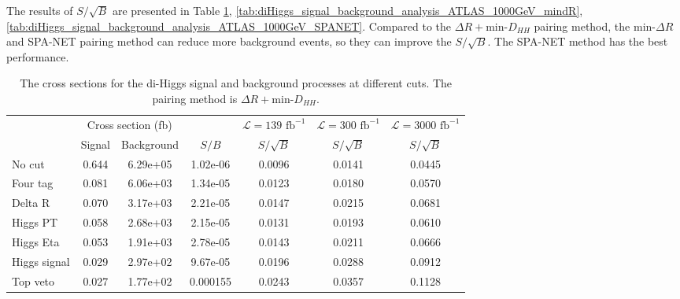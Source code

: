 \documentclass[12pt]{article}
\begin{document}
	The results of $S/\sqrt{B}$ are presented in Table \ref{tab:diHiggs_signal_background_analysis_ATLAS_1000GeV_DHH}, \ref{tab:diHiggs_signal_background_analysis_ATLAS_1000GeV_mindR}, \ref{tab:diHiggs_signal_background_analysis_ATLAS_1000GeV_SPANET}. Compared to the $\Delta R + \text{min-}D_{HH}$ pairing method, the $\text{min-}\Delta R$ and SPA-NET pairing method can reduce more background events, so they can improve the $S/\sqrt{B}$. The SPA-NET method has the best performance.
	\begin{table}[htpb]
		\centering
		\caption{The cross sections for the di-Higgs signal and background processes at different cuts. The pairing method is $\Delta R + \text{min-}D_{HH}$.}
		\label{tab:diHiggs_signal_background_analysis_ATLAS_1000GeV_DHH}
		\begin{tabular}{l|cc|c|c|c|c}
						 & \multicolumn{2}{c|}{Cross section (fb)} &          & $\mathcal{L} = 139 \text{ fb}^{-1}$ & $\mathcal{L} = 300 \text{ fb}^{-1}$ & $\mathcal{L} = 3000 \text{ fb}^{-1}$ \\
						 & Signal           & Background           & $S / B$  & $S/\sqrt{B}$                        & $S/\sqrt{B}$                        & $S/\sqrt{B}$                         \\ \hline
			No cut       & 0.644 & 6.29e+05 & 1.02e-06 & 0.0096 & 0.0141 & 0.0445 \\
			Four tag     & 0.081 & 6.06e+03 & 1.34e-05 & 0.0123 & 0.0180 & 0.0570 \\
			Delta R      & 0.070 & 3.17e+03 & 2.21e-05 & 0.0147 & 0.0215 & 0.0681 \\
			Higgs PT     & 0.058 & 2.68e+03 & 2.15e-05 & 0.0131 & 0.0193 & 0.0610 \\
			Higgs Eta    & 0.053 & 1.91e+03 & 2.78e-05 & 0.0143 & 0.0211 & 0.0666 \\
			Higgs signal & 0.029 & 2.97e+02 & 9.67e-05 & 0.0196 & 0.0288 & 0.0912 \\
			Top veto     & 0.027 & 1.77e+02 & 0.000155 & 0.0243 & 0.0357 & 0.1128
		\end{tabular}
	\end{table}
\end{document}
